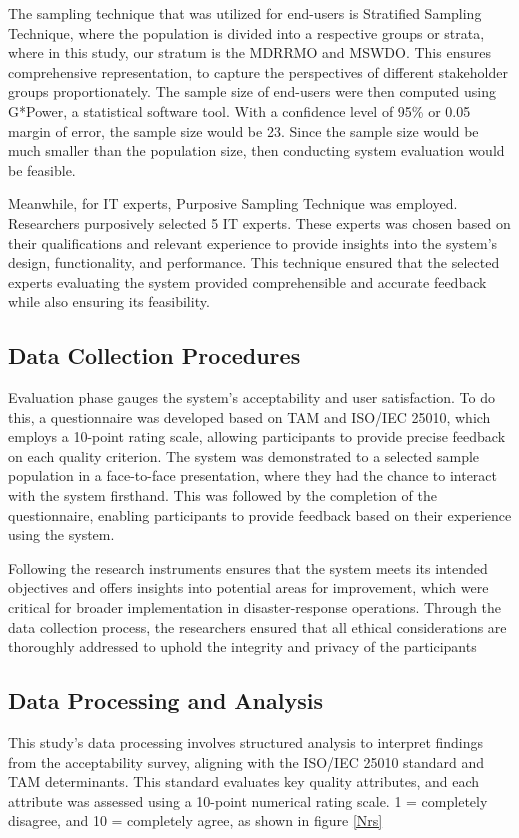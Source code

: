 	The sampling technique that was utilized for end-users is Stratified Sampling Technique, where the population is divided into a respective groups or strata, where in this study, our stratum is the MDRRMO and MSWDO. This ensures comprehensive representation, to capture the perspectives of different stakeholder groups proportionately. The sample size of end-users were then computed using G*Power, a statistical software tool. With a confidence level of 95\% or 0.05 margin of error, the sample size would be 23. Since the sample size would be much smaller than the population size, then conducting system evaluation would be feasible.
	
	Meanwhile, for IT experts, Purposive Sampling Technique was employed. Researchers purposively selected 5 IT experts. These experts was chosen based on their qualifications and relevant experience to provide insights into the system's design, functionality, and performance. This technique ensured that the selected experts evaluating the system provided comprehensible and accurate feedback while also ensuring its feasibility.
	
\subsection{Data Collection Procedures}
	Evaluation phase gauges the system’s acceptability and user satisfaction. To do this, a questionnaire was developed based on TAM and ISO/IEC 25010, which employs a 10-point rating scale, allowing participants to provide precise feedback on each quality criterion. The system was demonstrated to a selected sample population in a face-to-face presentation, where they had the chance to interact with the system firsthand. This was followed by the completion of the questionnaire, enabling participants to provide feedback based on their experience using the system.
	
	Following the research instruments ensures that the system meets its intended objectives and offers insights into potential areas for improvement, which were critical for broader implementation in disaster-response operations. Through the data collection process, the researchers ensured that all ethical considerations are thoroughly addressed to uphold the integrity and privacy of the participants

\subsection{Data Processing and Analysis}
	This study's data processing involves structured analysis to interpret findings from the acceptability survey, aligning with the ISO/IEC 25010 standard and TAM determinants. This standard evaluates key quality attributes, and each attribute was assessed using a 10-point numerical rating scale. 1 = completely disagree, and 10 = completely agree, as shown in figure \ref{Nrs}
	
